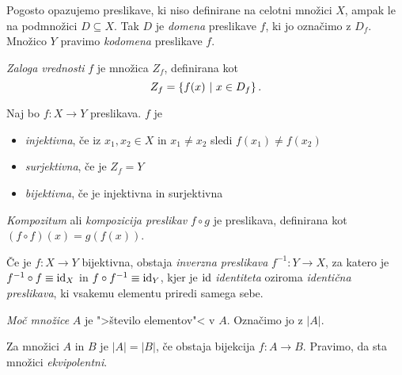 \documentclass[12pt, a4paper]{article}
\begin{document}
Pogosto opazujemo preslikave, ki niso definirane na celotni množici $X$, ampak le na podmnožici $D\subseteq X$. Tak $D$ je \emph{domena} preslikave $f$, ki jo označimo z $D_f$. Množico $Y$ pravimo \emph{kodomena} preslikave $f$.

\begin{definicija}
\emph{Zaloga vrednosti} $f$ je množica $Z_f$, definirana kot
\[
Z_f=\left\{f(x)~\middle\vert~x\in D_f\right\}.
\]
\end{definicija}

\begin{definicija}
Naj bo $f\colon X\to Y$ preslikava. $f$ je

\begin{itemize}
\item \emph{injektivna}, če iz $x_1,x_2\in X$ in $x_1\ne x_2$ sledi $f(x_1)\ne f(x_2)$
\item \emph{surjektivna}, če je $Z_f=Y$
\item \emph{bijektivna}, če je injektivna in surjektivna
\end{itemize}
\end{definicija}

\begin{definicija}
\emph{Kompozitum} ali \emph{kompozicija preslikav} $f\circ g$ je preslikava, definirana kot $(f\circ f)(x)=g(f(x))$.
\end{definicija}

\begin{definicija}
Če je $f\colon X\to Y$ bijektivna, obstaja \emph{inverzna preslikava} $f^{-1}\colon Y\to X$, za katero je $f^{-1}\circ f\equiv \operatorname{id}_X$ in $f\circ f^{-1}\equiv \operatorname{id}_Y$, kjer je $\operatorname{id}$ \emph{identiteta} oziroma \emph{identična preslikava}, ki vsakemu elementu priredi samega sebe.
\end{definicija}

\begin{definicija}
\emph{Moč množice} $A$ je ">število elementov"< v $A$. Označimo jo z $|A|$.
\end{definicija}

\begin{definicija}
Za množici $A$ in $B$ je $|A|=|B|$, če obstaja bijekcija $f\colon A\to B$. Pravimo, da sta množici \emph{ekvipolentni}.
\end{definicija}
\end{document}
